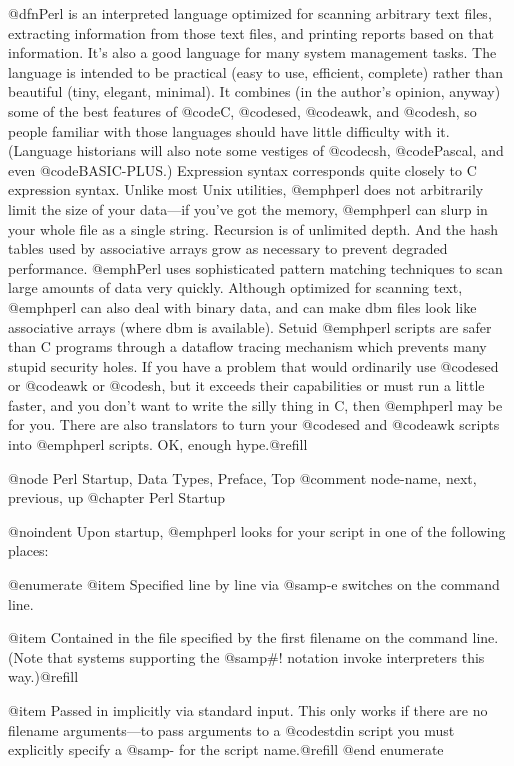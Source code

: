 @dfn{Perl} is an interpreted language optimized for scanning arbitrary
text files, extracting information from those text files, and printing
reports based on that information.  It's also a good language for many
system management tasks.  The language is intended to be practical (easy
to use, efficient, complete) rather than beautiful (tiny, elegant,
minimal).  It combines (in the author's opinion, anyway) some of the
best features of @code{C}, @code{sed}, @code{awk}, and @code{sh}, so
people familiar with those languages should have little difficulty with
it.  (Language historians will also note some vestiges of @code{csh},
@code{Pascal}, and even @code{BASIC-PLUS}.)  Expression syntax
corresponds quite closely to C expression syntax.  Unlike most Unix
utilities, @emph{perl} does not arbitrarily limit the size of your
data---if you've got the memory, @emph{perl} can slurp in your whole
file as a single string.  Recursion is of unlimited depth.  And the hash
tables used by associative arrays grow as necessary to prevent degraded
performance.  @emph{Perl} uses sophisticated pattern matching techniques
to scan large amounts of data very quickly.  Although optimized for
scanning text, @emph{perl} can also deal with binary data, and can make
dbm files look like associative arrays (where dbm is available).  Setuid
@emph{perl} scripts are safer than C programs through a dataflow tracing
mechanism which prevents many stupid security holes.  If you have a
problem that would ordinarily use @code{sed} or @code{awk} or @code{sh},
but it exceeds their capabilities or must run a little faster, and you
don't want to write the silly thing in C, then @emph{perl} may be for
you.  There are also translators to turn your @code{sed} and @code{awk}
scripts into @emph{perl} scripts.  OK, enough hype.@refill


@node Perl Startup, Data Types, Preface, Top
@comment  node-name,  next,  previous,  up
@chapter Perl Startup

@noindent
Upon startup, @emph{perl} looks for your script in one of the following
places:

@enumerate
@item
Specified line by line via @samp{-e} switches on the command line.

@item
Contained in the file specified by the first filename on the command
line.  (Note that systems supporting the @samp{#!} notation invoke
interpreters this way.)@refill

@item
Passed in implicitly via standard input.  This only works if there are
no filename arguments---to pass arguments to a @code{stdin} script you
must explicitly specify a @samp{-} for the script name.@refill
@end enumerate

